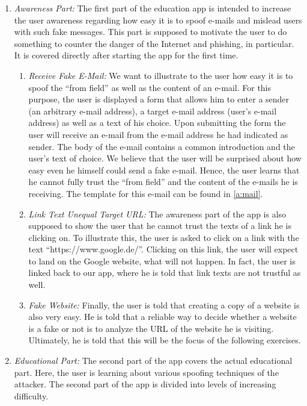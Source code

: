 \begin{enumerate}
	\item \textit{Awareness Part:} The first part of the education app is intended to increase the user awareness regarding how easy it is to spoof e-mails and mislead users with such fake messages.
 This part is supposed to motivate the user to do something to counter the danger of the Internet and phishing, in particular.
It is covered directly after starting the app for the first time.
\begin{enumerate}
		\item \textit{Receive Fake E-Mail:} We want to illustrate to the user how easy it is to spoof the ``from field'' as well as the content of an e-mail.
 For this purpose, the user is displayed a form that allows him to enter a sender (an arbitrary e-mail address), a target e-mail address (user's e-mail address) as well as a text of his choice.
 Upon submitting the form the user will receive an e-mail from the e-mail address he had indicated as sender.
The body of the e-mail contains a common introduction and the user's text of choice.
 We believe that the user will be surprised about how easy even he himself could send a fake e-mail.
Hence, the user learns that he cannot fully trust the ``from field'' and the content of the e-mails he is receiving.
The template for this e-mail can be found in \autoref{a:mail}.
		\item \textit{Link Text Unequal Target URL:} The awareness part of the app is also supposed to show the user that he cannot trust the texts of a link he is clicking on.
 To illustrate this, the user is asked to click on a link with the text ``https://www.google.de/''. Clicking on this link, the user will expect to land on the Google website, what will not happen.
 In fact, the user is linked back to our app, where he is told that link texts are not trustful as well.
 
	\item \textit{Fake Website:} Finally, the user is told that creating a copy of a website is also very easy.
 He is told that a reliable way to decide whether a website is a fake or not is to analyze the URL of the website he is visiting.
Ultimately, he is told that this will be the focus of the following exercises.

\end{enumerate}
	\item \textit{Educational Part:} The second part of the app covers the actual educational part.
 Here, the user is learning about various spoofing techniques of the attacker. The second part of the app is divided into levels of increasing difficulty.


\end{enumerate}
